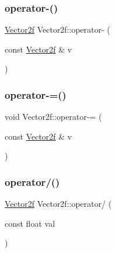 \mbox{\label{class_vector2f_a86b9209af5401c4a10ab301522eb79c3}} 
\subsubsection{\texorpdfstring{operator-\/()}{operator-()}}
{\footnotesize\ttfamily \mbox{\hyperlink{class_vector2f}{Vector2f}} Vector2f\+::operator-\/ (\begin{DoxyParamCaption}\item[{const \mbox{\hyperlink{class_vector2f}{Vector2f}} \&}]{v }\end{DoxyParamCaption})}

\mbox{\label{class_vector2f_ad52243b72cb0524e4ac6d3cdfbc5e5fe}} 
\subsubsection{\texorpdfstring{operator-\/=()}{operator-=()}}
{\footnotesize\ttfamily void Vector2f\+::operator-\/= (\begin{DoxyParamCaption}\item[{const \mbox{\hyperlink{class_vector2f}{Vector2f}} \&}]{v }\end{DoxyParamCaption})}

\mbox{\label{class_vector2f_a38743f5e4f426a0b1a51a2bcafb9d4b6}} 
\subsubsection{\texorpdfstring{operator/()}{operator/()}}
{\footnotesize\ttfamily \mbox{\hyperlink{class_vector2f}{Vector2f}} Vector2f\+::operator/ (\begin{DoxyParamCaption}\item[{const float}]{val }\end{DoxyParamCaption})}

\mbox{\label{class_vector2f_af4696d8e4c4055162e3412efbe95b7e0}} 
